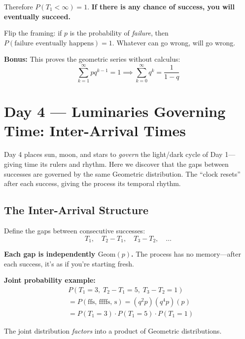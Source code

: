\documentclass[11pt]{article}
\begin{document}
Therefore $P(T_1 < \infty) = 1$. \textbf{If there is any chance of success, you will eventually succeed.}

\begin{conceptbox}
Flip the framing: if $p$ is the probability of \emph{failure}, then $P(\text{failure eventually happens}) = 1$. Whatever can go wrong, will go wrong.

\textbf{Bonus:} This proves the geometric series without calculus:
\[
\sum_{k=1}^{\infty} p q^{k-1} = 1 \implies \sum_{k=0}^{\infty} q^k = \frac{1}{1-q}
\]
\end{conceptbox}

\section{Day 4 --- Luminaries Governing Time: Inter-Arrival Times}

\begin{creationbox}
Day 4 places sun, moon, and stars to \emph{govern} the light/dark cycle of Day 1---giving time its rulers and rhythm. Here we discover that the gaps between successes are governed by the same Geometric distribution. The ``clock resets'' after each success, giving the process its temporal rhythm.
\end{creationbox}

\subsection{The Inter-Arrival Structure}

Define the gaps between consecutive successes:
\[
T_1, \quad T_2 - T_1, \quad T_3 - T_2, \quad \ldots
\]

\textbf{Each gap is independently $\text{Geom}(p)$.} The process has no memory---after each success, it's as if you're starting fresh.

\textbf{Joint probability example:}
\begin{align*}
&P(T_1 = 3,\; T_2 - T_1 = 5,\; T_3 - T_2 = 1) \\
&= P(\text{ffs, ffffs, s}) = (q^2 p)(q^4 p)(p) \\
&= P(T_1 = 3) \cdot P(T_1 = 5) \cdot P(T_1 = 1)
\end{align*}

The joint distribution \emph{factors} into a product of Geometric distributions.
\end{document}
